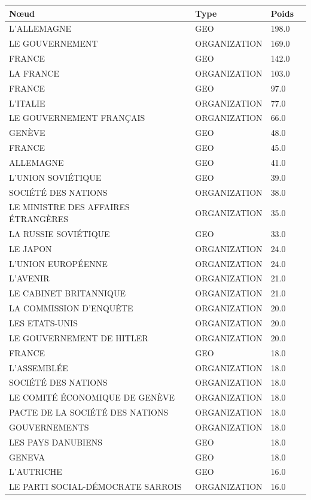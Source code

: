 \documentclass[a4paper,twoside,12pt]{book}
\begin{document}
\begin{table}[htbp]
\centering
\begin{tabular}{ll@{\hskip 1cm}ll}
\hline
\textbf{Nœud} & \textbf{Type} & \textbf{Poids} \\
\hline
L'ALLEMAGNE & GEO & 198.0 \\
LE GOUVERNEMENT & ORGANIZATION & 169.0 \\
FRANCE & GEO & 142.0 \\
LA FRANCE & ORGANIZATION & 103.0 \\
FRANCE & GEO & 97.0 \\
L'ITALIE & ORGANIZATION & 77.0 \\
LE GOUVERNEMENT FRANÇAIS & ORGANIZATION & 66.0 \\
GENÈVE & GEO & 48.0 \\
FRANCE & GEO & 45.0 \\
ALLEMAGNE & GEO & 41.0 \\
L'UNION SOVIÉTIQUE & GEO & 39.0 \\
SOCIÉTÉ DES NATIONS & ORGANIZATION & 38.0 \\
LE MINISTRE DES AFFAIRES ÉTRANGÈRES & ORGANIZATION & 35.0 \\
LA RUSSIE SOVIÉTIQUE & GEO & 33.0 \\
LE JAPON & ORGANIZATION & 24.0 \\
L'UNION EUROPÉENNE & ORGANIZATION & 24.0 \\
L'AVENIR & ORGANIZATION & 21.0 \\
LE CABINET BRITANNIQUE & ORGANIZATION & 21.0 \\
LA COMMISSION D'ENQUÊTE & ORGANIZATION & 20.0 \\
LES ETATS-UNIS & ORGANIZATION & 20.0 \\
LE GOUVERNEMENT DE HITLER & ORGANIZATION & 20.0 \\
FRANCE & GEO & 18.0 \\
L'ASSEMBLÉE & ORGANIZATION & 18.0 \\
SOCIÉTÉ DES NATIONS & ORGANIZATION & 18.0 \\
LE COMITÉ ÉCONOMIQUE DE GENÈVE & ORGANIZATION & 18.0 \\
PACTE DE LA SOCIÉTÉ DES NATIONS & ORGANIZATION & 18.0 \\
GOUVERNEMENTS & ORGANIZATION & 18.0 \\
LES PAYS DANUBIENS & GEO & 18.0 \\
GENEVA & GEO & 18.0 \\
L'AUTRICHE & GEO & 16.0 \\
LE PARTI SOCIAL-DÉMOCRATE SARROIS & ORGANIZATION & 16.0 \\

\end{tabular}
\end{table}
\end{document}
